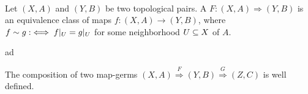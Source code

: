 
 \\
Let $(X, A)$ and $(Y, B)$ be two topological pairs.
A  $F: (X, A) \Rightarrow (Y, B)$ is an equivalence class of maps $f: (X, A) \to (Y, B)$, where
$f \sim g :\iff f\vert_{U} = g\vert_{U}$ for some neighborhood $U \subseteq X$ of $A$. 

ad

\begin{remark}
The composition of two map-germs $(X, A) \overset{F}{\Rightarrow} (Y, B) \overset{G}{\Rightarrow} (Z, C)$ is well defined.
\end{remark}